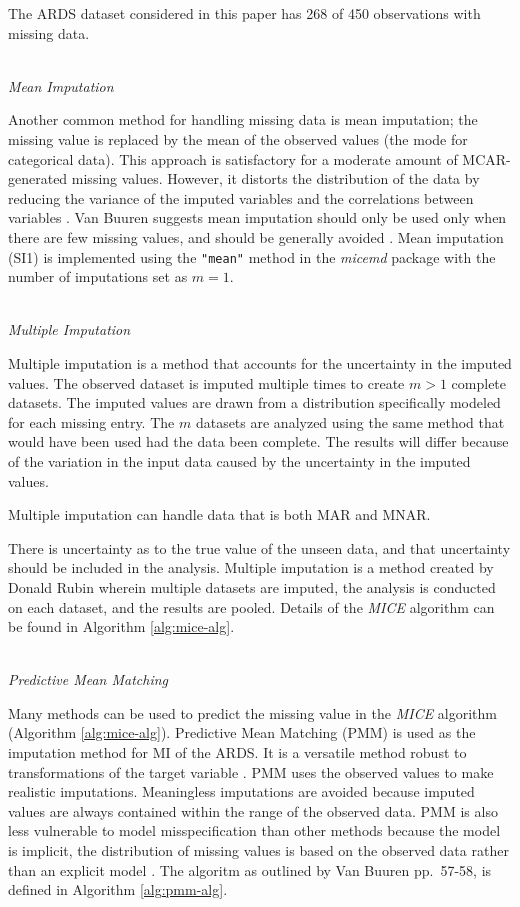\documentclass[12pt,]{article}
\begin{document}
The ARDS dataset considered in this paper has 268 of 450 observations
with missing data.

\(~\)\\
\emph{Mean Imputation}

Another common method for handling missing data is mean imputation; the
missing value is replaced by the mean of the observed values (the mode
for categorical data). This approach is satisfactory for a moderate
amount of MCAR-generated missing values. However, it distorts the
distribution of the data by reducing the variance of the imputed
variables and the correlations between variables
\autocite{little_bayes_2014}. Van Buuren suggests mean imputation should
only be used only when there are few missing values, and should be
generally avoided \autocite{van_buuren_flexible_2012}. Mean imputation
(SI1) is implemented using the \texttt{"mean"} method in the
\emph{micemd} package with the number of imputations set as \(m=1\).

\(~\)\\
\emph{Multiple Imputation}

Multiple imputation is a method that accounts for the uncertainty in the
imputed values. The observed dataset is imputed multiple times to create
\(m>1\) complete datasets. The imputed values are drawn from a
distribution specifically modeled for each missing entry. The \(m\)
datasets are analyzed using the same method that would have been used
had the data been complete. The results will differ because of the
variation in the input data caused by the uncertainty in the imputed
values.

Multiple imputation can handle data that is both MAR and MNAR.

There is uncertainty as to the true value of the unseen data, and that
uncertainty should be included in the analysis. Multiple imputation is a
method created by Donald Rubin wherein multiple datasets are imputed,
the analysis is conducted on each dataset, and the results are pooled.
Details of the \emph{MICE} algorithm can be found in Algorithm
\ref{alg:mice-alg}.

\(~\)\\
\emph{Predictive Mean Matching}

Many methods can be used to predict the missing value in the \emph{MICE}
algorithm (Algorithm \ref{alg:mice-alg}). Predictive Mean Matching
\autocites{rubin_statistical_1986}{little_missing-data_1988} (PMM) is
used as the imputation method for MI of the ARDS. It is a versatile
method robust to transformations of the target variable
\autocite[pp.~69]{van_buuren_flexible_2012}. PMM uses the observed
values to make realistic imputations. Meaningless imputations are
avoided because imputed values are always contained within the range of
the observed data. PMM is also less vulnerable to model misspecification
than other methods because the model is implicit, the distribution of
missing values is based on the observed data rather than an explicit
model \autocite{little_bayes_2014}. The algoritm as outlined by Van
Buuren \textcite{van_buuren_flexible_2012} pp.~57-58, is defined in
Algorithm \ref{alg:pmm-alg}.
\end{document}
